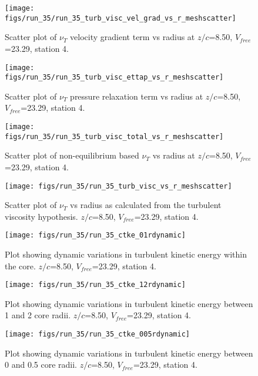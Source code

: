 \begin{figure}[H]
\centering
\texttt{[image: figs/run\_35/run\_35\_turb\_visc\_vel\_grad\_vs\_r\_meshscatter]}
\caption{Scatter plot of $\nu_T$ velocity gradient term vs radius at $z/c$=8.50, $V_{free}$=23.29, station 4.}
\end{figure}


\begin{figure}[H]
\centering
\texttt{[image: figs/run\_35/run\_35\_turb\_visc\_ettap\_vs\_r\_meshscatter]}
\caption{Scatter plot of $\nu_T$ pressure relaxation term vs radius at $z/c$=8.50, $V_{free}$=23.29, station 4.}
\end{figure}


\begin{figure}[H]
\centering
\texttt{[image: figs/run\_35/run\_35\_turb\_visc\_total\_vs\_r\_meshscatter]}
\caption{Scatter plot of non-equilibrium based $\nu_T$ vs radius at $z/c$=8.50, $V_{free}$=23.29, station 4.}
\end{figure}


\begin{figure}[H]
\centering
\texttt{[image: figs/run\_35/run\_35\_turb\_visc\_vs\_r\_meshscatter]}
\caption{Scatter plot of $\nu_T$ vs radius as calculated from the turbulent viscosity hypothesis. $z/c$=8.50, $V_{free}$=23.29, station 4.}
\end{figure}


\begin{figure}[H]
\centering
\texttt{[image: figs/run\_35/run\_35\_ctke\_01rdynamic]}
\caption{Plot showing dynamic variations in turbulent kinetic energy within the core. $z/c$=8.50, $V_{free}$=23.29, station 4.}
\end{figure}


\begin{figure}[H]
\centering
\texttt{[image: figs/run\_35/run\_35\_ctke\_12rdynamic]}
\caption{Plot showing dynamic variations in turbulent kinetic energy between 1 and 2 core radii. $z/c$=8.50, $V_{free}$=23.29, station 4.}
\end{figure}


\begin{figure}[H]
\centering
\texttt{[image: figs/run\_35/run\_35\_ctke\_005rdynamic]}
\caption{Plot showing dynamic variations in turbulent kinetic energy between 0 and 0.5 core radii. $z/c$=8.50, $V_{free}$=23.29, station 4.}
\end{figure}



